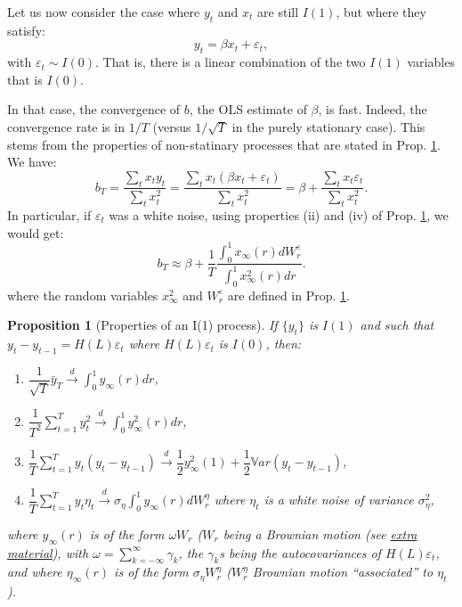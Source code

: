 \documentclass[
  11pt,
]{book}
\providecommand{\tightlist}{%
  \setlength{\itemsep}{0pt}\setlength{\parskip}{0pt}}
\newtheorem{proposition}{Proposition}[chapter]
\theoremstyle{definition}
\theoremstyle{definition}
\theoremstyle{definition}
\theoremstyle{definition}
\theoremstyle{remark}
\begin{document}
Let us now consider the case where \(y_t\) and \(x_t\) are still \(I(1)\), but where they satisfy:
\begin{equation}
y_t = \beta x_t + \varepsilon_t,\label{eq:yxI1}
\end{equation}
with \(\varepsilon_t \sim I(0)\). That is, there is a linear combination of the two \(I(1)\) variables that is \(I(0)\).

In that case, the convergence of \(b\), the OLS estimate of \(\beta\), is fast. Indeed, the convergence rate is in \(1/T\) (versus \(1/\sqrt{T}\) in the purely stationary case). This stems from the properties of non-statinary processes that are stated in Prop. \ref{prp:I1process}. We have:
\[
b_T = \frac{\sum_t x_t y_t}{\sum_t x_t^2} = \frac{\sum_t x_t (\beta x_t + \varepsilon_t)}{\sum_t x_t^2}
= \beta + \frac{\sum_t x_t \varepsilon_t}{\sum_t x_t^2}.
\]
In particular, if \(\varepsilon_t\) was a white noise, using properties (ii) and (iv) of Prop. \ref{prp:I1process}, we would get:
\begin{equation}
b_T \approx \beta + \frac{1}{T}\frac{\int_{0}^{1}x_{\infty}(r)dW^{\varepsilon}_r}{\int_{0}^{1}x^2_{\infty}(r)dr}.\label{eq:bTsuperconv}
\end{equation}
where the random variables \(x^2_{\infty}\) and \(W^{\varepsilon}_r\) are defined in Prop. \ref{prp:I1process}.

\begin{proposition}[Properties of an I(1) process]
\protect\hypertarget{prp:I1process}{}\label{prp:I1process}If \(\{y_t\}\) is \(I(1)\) and such that \(y_t - y_{t-1} = H(L)\varepsilon_t\) where \(H(L)\varepsilon_t\) is \(I(0)\), then:

\begin{enumerate}
\def\labelenumi{\roman{enumi}.}
\tightlist
\item
  \(\dfrac{1}{\sqrt{T}}\bar{y}_T \overset{d}{\rightarrow} \int_{0}^{1}y_{\infty}(r)dr\),
\item
  \(\dfrac{1}{T^2}\sum_{t=1}^T y_t^2 \overset{d}{\rightarrow} \int_{0}^{1}y^2_{\infty}(r)dr\),
\item
  \(\dfrac{1}{T}\sum_{t=1}^T y_t(y_t-y_{t-1}) \overset{d}{\rightarrow} \dfrac{1}{2}y^2_{\infty}(1) + \dfrac{1}{2}\mathbb{V}ar(y_t - y_{t-1})\),
\item
  \(\dfrac{1}{T}\sum_{t=1}^T y_t \eta_t \overset{d}{\rightarrow} \sigma_\eta \int_{0}^{1}y_{\infty}(r)dW_r^{\eta}\) where \(\eta_t\) is a white noise of variance \(\sigma_\eta^2\),
\end{enumerate}

where \(y_{\infty}(r)\) is of the form \(\omega W_r\) (\(W_r\) being a Brownian motion (see \href{https://www.dropbox.com/s/w4qc1c32pzkxngv/Simul_Brownian.pdf?dl=0}{extra material}), with \(\omega = \sum_{k=-\infty}^{\infty} \gamma_k\), the \(\gamma_k\)s being the autocovariances of \(H(L)\varepsilon_t\), and where \(\eta_{\infty}(r)\) is of the form \(\sigma_\eta W^{\eta}_r\) (\(W^{\eta}_r\) Brownian motion ``associated'' to \(\eta_t\)).
\end{proposition}
\end{document}
